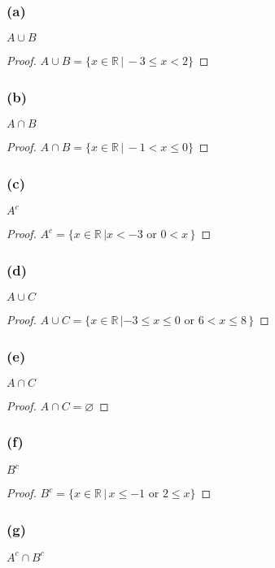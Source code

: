 \documentclass[14pt]{extarticle}
\newcommand{\es}{\varnothing}
\newcommand{\R}{\mathbb{R}}
\begin{document}
\subsubsection{(a)}
$A \cup B$

\begin{proof}
  \(A \cup B = \{x \in \R \, | \, -3 \leq x < 2\}\)
\end{proof}

\subsubsection{(b)}
$A \cap B$

\begin{proof}
  \(A \cap B = \{x \in \R \, | \, -1 < x \leq 0\}\)
\end{proof}

\subsubsection{(c)}
$A^c$

\begin{proof}
  \(A^c = \{x \in \R \, | x < -3 \text{ or } 0 < x\, \}\)
\end{proof}

\subsubsection{(d)}
$A \cup C$

\begin{proof}
  \(A \cup C = \{x \in \R \, | -3 \leq x \leq 0 \text{ or } 6 < x \leq 8\, \}\)
\end{proof}

\subsubsection{(e)}
$A \cap C$

\begin{proof}
  \(A \cap C = \es\)
\end{proof}

\subsubsection{(f)}
$B^c$

\begin{proof}
  \(B^c = \{x \in \R \, | \, x \leq -1 \text{ or } 2 \leq x\}\)
\end{proof}

\subsubsection{(g)}
$A^c \cap B^c$
\end{document}
